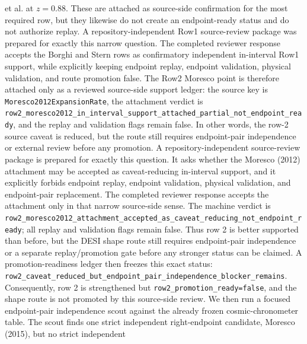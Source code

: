 \documentclass[11pt]{article}
\begin{document}
et al. at \(z=0.88\).  These are attached as source-side confirmation for the
most required row, but they likewise do not create an endpoint-ready status and
do not authorize replay.
A repository-independent Row1 source-review package was prepared for exactly
this narrow question.  The completed reviewer response accepts the Borghi and
Stern rows as confirmatory independent in-interval Row1 support, while
explicitly keeping endpoint replay, endpoint validation, physical validation,
and route promotion false.
The Row2 Moresco point is therefore attached only as a reviewed source-side
support ledger:
the source key is \texttt{Moresco2012ExpansionRate}, the attachment verdict is
\texttt{row2\_\allowbreak{}moresco2012\_\allowbreak{}in\_\allowbreak{}interval\_\allowbreak{}support\_\allowbreak{}attached\_\allowbreak{}partial\_\allowbreak{}not\_\allowbreak{}endpoint\_\allowbreak{}ready},
and the replay and validation flags remain false. In other words, the row-2
source caveat is reduced, but the route still requires endpoint-pair
independence or external review before any promotion.
A repository-independent source-review package is prepared for exactly this
question. It asks whether the Moresco (2012) attachment may be accepted as
caveat-reducing in-interval support, and it explicitly forbids endpoint replay,
endpoint validation, physical validation, and endpoint-pair replacement.
The completed reviewer response accepts the attachment only in that narrow
source-side sense. The machine verdict is
\texttt{row2\_\allowbreak{}moresco2012\_\allowbreak{}attachment\_\allowbreak{}accepted\_\allowbreak{}as\_\allowbreak{}caveat\_\allowbreak{}reducing\_\allowbreak{}not\_\allowbreak{}endpoint\_\allowbreak{}ready};
all replay and validation flags remain false. Thus row 2 is better supported
than before, but the DESI shape route still requires endpoint-pair independence
or a separate replay/promotion gate before any stronger status can be claimed.
A promotion-readiness ledger then freezes this exact status:
\texttt{row2\_\allowbreak{}caveat\_\allowbreak{}reduced\_\allowbreak{}but\_\allowbreak{}endpoint\_\allowbreak{}pair\_\allowbreak{}independence\_\allowbreak{}blocker\_\allowbreak{}remains}.
Consequently, row 2 is strengthened but
\texttt{row2\_\allowbreak{}promotion\_\allowbreak{}ready=\allowbreak{}false}, and the shape route is not promoted by
this source-side review.
We then run a focused endpoint-pair independence scout against the already
frozen cosmic-chronometer table.  The scout finds one strict independent
right-endpoint candidate, Moresco (2015), but no strict independent
\end{document}
